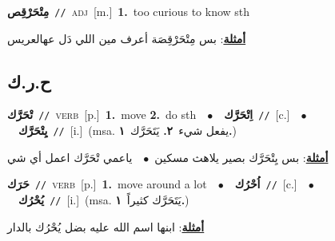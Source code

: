 \documentclass[10pt,a4paper,twoside]{article} %
\begin{document}
\begin{multicols}{2}
{\setlength\topsep{0pt}\textbf{\foreignlanguage{arabic}{مِتْحَرْقِص}}\ {\color{gray}\texttt{//}\color{black}}\ \textsc{adj}\ [m.]\ \textbf{1.}~too curious to know sth\  \begin{flushright}\color{gray}\foreignlanguage{arabic}{\textbf{\underline{\foreignlanguage{arabic}{أمثلة}}}: بس مِتْحَرْقِصَة أعرف مين اللي دَل عهالعريس}\end{flushright}\color{black}} \vspace{2mm}

\vspace{-3mm}
\subsection*{\color{blue}\foreignlanguage{arabic}{ح.ر.ك}\color{blue}{}} 

{\setlength\topsep{0pt}\textbf{\foreignlanguage{arabic}{تْحَرَّك}}\ {\color{gray}\texttt{//}\color{black}}\ \textsc{verb}\ [p.]\ \textbf{1.}~move  \textbf{2.}~do sth\ \ $\bullet$\ \ \setlength\topsep{0pt}\textbf{\foreignlanguage{arabic}{اِتْحَرَّك}}\ {\color{gray}\texttt{//}\color{black}}\ [c.]\ \ $\bullet$\ \ \setlength\topsep{0pt}\textbf{\foreignlanguage{arabic}{يِتْحَرَّك}}\ {\color{gray}\texttt{//}\color{black}}\ [i.]\ \color{gray}(msa. \foreignlanguage{arabic}{يفعل شيء}~\foreignlanguage{arabic}{\textbf{٢.}}  \foreignlanguage{arabic}{يَتَحَرَّك}~\foreignlanguage{arabic}{\textbf{١.}})\color{black}\  \begin{flushright}\color{gray}\foreignlanguage{arabic}{\textbf{\underline{\foreignlanguage{arabic}{أمثلة}}}: بس يِتْحَرَّك بصير يلاهث مسكين\ $\bullet$\ \  ياعمي تْحَرَّك اعمل أي شي}\end{flushright}\color{black}} \vspace{2mm}

{\setlength\topsep{0pt}\textbf{\foreignlanguage{arabic}{حَرَك}}\ {\color{gray}\texttt{//}\color{black}}\ \textsc{verb}\ [p.]\ \textbf{1.}~move around a lot\ \ $\bullet$\ \ \setlength\topsep{0pt}\textbf{\foreignlanguage{arabic}{اُحْرُك}}\ {\color{gray}\texttt{//}\color{black}}\ [c.]\ \ $\bullet$\ \ \setlength\topsep{0pt}\textbf{\foreignlanguage{arabic}{يُحْرُك}}\ {\color{gray}\texttt{//}\color{black}}\ [i.]\ \color{gray}(msa. \foreignlanguage{arabic}{يَتَحَرَّك كثيراً}~\foreignlanguage{arabic}{\textbf{١.}})\color{black}\  \begin{flushright}\color{gray}\foreignlanguage{arabic}{\textbf{\underline{\foreignlanguage{arabic}{أمثلة}}}: ابنها اسم الله عليه بضل يُحْرُك بالدار}\end{flushright}\color{black}} \vspace{2mm}


\end{multicols}
\end{document}
